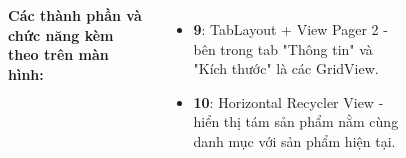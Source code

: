 \documentclass{beamer}
\begin{document}
\begin{frame}
\begin{columns}
\begin{figure}
        \end{figure}
        \indent \textbf{Các thành phần và chức năng kèm theo trên màn hình:}
        \begin{itemize}
            \item \textbf{9}: TabLayout + View Pager 2 - bên trong tab "Thông tin" và "Kích thước" là các GridView.
            \item \textbf{10}: Horizontal Recycler View - hiển thị tám sản phẩm nằm cùng danh mục với sản phẩm hiện tại.

        \end{itemize}
    \end{columns}
\end{frame}

\end{document}
